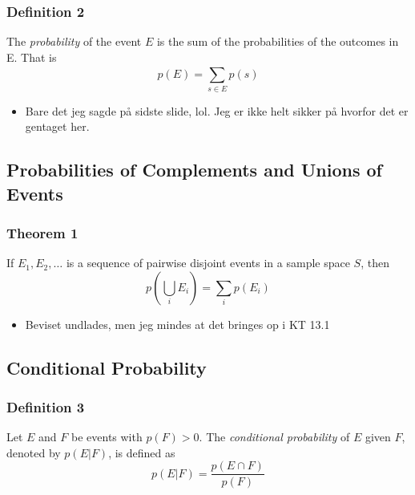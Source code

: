 \documentclass{beamer}
\begin{document}
\begin{frame}
  \frametitle{Definition 2}
  \begin{definition}
    The \textit{probability}  of the event $E$ is the sum of the probabilities of the outcomes in E. That is $$p(E) = \sum_{s \in E}^{}p(s)$$

  \end{definition}
  \begin{itemize}
  \item Bare det jeg sagde på sidste slide, lol. Jeg er ikke helt sikker på hvorfor det er gentaget her.
  \end{itemize}
\end{frame}

\subsection{Probabilities of Complements and Unions of Events}
\label{subsec:label}

\begin{frame}
  \frametitle{Theorem 1}
  \begin{theorem}

    If $E_{1}, E_{2}, \ldots$ is a sequence of pairwise disjoint events in a sample space $S$, then $$p \left ( \bigcup_{i} E_{i} \right ) = \sum_{i}^{} p(E_{i})$$
  \end{theorem}
  \begin{itemize}
  \item Beviset undlades, men jeg mindes at det bringes op i KT 13.1
  \end{itemize}
\end{frame}

\subsection{Conditional Probability}
\label{subsec:condprob}

\begin{frame}
  \frametitle{Definition 3}
  \begin{definition}
    Let $E$ and $F$ be events with $p(F) > 0$. The \textit{conditional probability} of $E$ given $F$, denoted by $p(E |F)$, is defined as $$p(E|F) = \frac{p(E \cap F)}{p(F)}$$
  \end{definition}
\end{frame}
\end{document}
